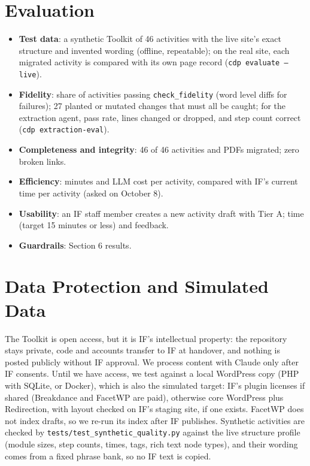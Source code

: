 \section{Evaluation}
\begin{itemize}
  \item \textbf{Test data}: a synthetic Toolkit of 46 activities with the live site's exact structure and invented wording (offline, repeatable); on the real site, each migrated activity is compared with its own page record (\texttt{cdp evaluate --live}).
  \item \textbf{Fidelity}: share of activities passing \texttt{check\_fidelity} (word level diffs for failures); 27 planted or mutated changes that must all be caught; for the extraction agent, pass rate, lines changed or dropped, and step count correct (\texttt{cdp extraction-eval}).
  \item \textbf{Completeness and integrity}: 46 of 46 activities and PDFs migrated; zero broken links.
  \item \textbf{Efficiency}: minutes and LLM cost per activity, compared with IF's current time per activity (asked on October 8).
  \item \textbf{Usability}: an IF staff member creates a new activity draft with Tier A; time (target 15 minutes or less) and feedback.
  \item \textbf{Guardrails}: Section 6 results.
\end{itemize}

\section{Data Protection and Simulated Data}
The Toolkit is open access, but it is IF's intellectual property: the repository stays private, code and accounts transfer to IF at handover, and nothing is posted publicly without IF approval. We process content with Claude only after IF consents. Until we have access, we test against a local WordPress copy (PHP with SQLite, or Docker), which is also the simulated target: IF's plugin licenses if shared (Breakdance and FacetWP are paid), otherwise core WordPress plus Redirection, with layout checked on IF's staging site, if one exists. FacetWP does not index drafts, so we re-run its index after IF publishes. Synthetic activities are checked by \texttt{tests/test\_synthetic\_quality.py} against the live structure profile (module sizes, step counts, times, tags, rich text node types), and their wording comes from a fixed phrase bank, so no IF text is copied.

